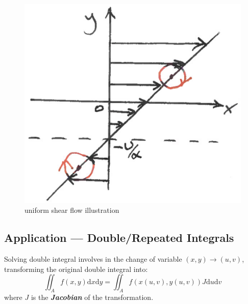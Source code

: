 \documentclass[12pt]{report}
\theoremstyle{definition}
\begin{document}
\begin{enumerate}[label = (\arabic*)]
\begin{enumerate}[label = (\alph*)]
                \begin{figure}
                  	\includegraphics[scale=0.15]{uniformShearFlow.jpeg}
                  	\centering
                    \caption{uniform shear flow illustration}\label{fig:shearFlow}
                \end{figure}
        \end{enumerate}
\end{enumerate}

\subsection{Application --- Double/Repeated Integrals}

Solving double integral involves in the change of variable $(x,y) \rightarrow{}(u,v)$,
transforming the original double integral into:\[
    \iint_{A}^{} f(x,y)\mathrm{d}x\mathrm{d}y = \iint_{A}^{} f(x(u,v),y(u,v))J\mathrm{d}u\mathrm{d}v
\]where $J$ is the \textbf{\emph{Jacobian}} of the transformation.
\end{document}
